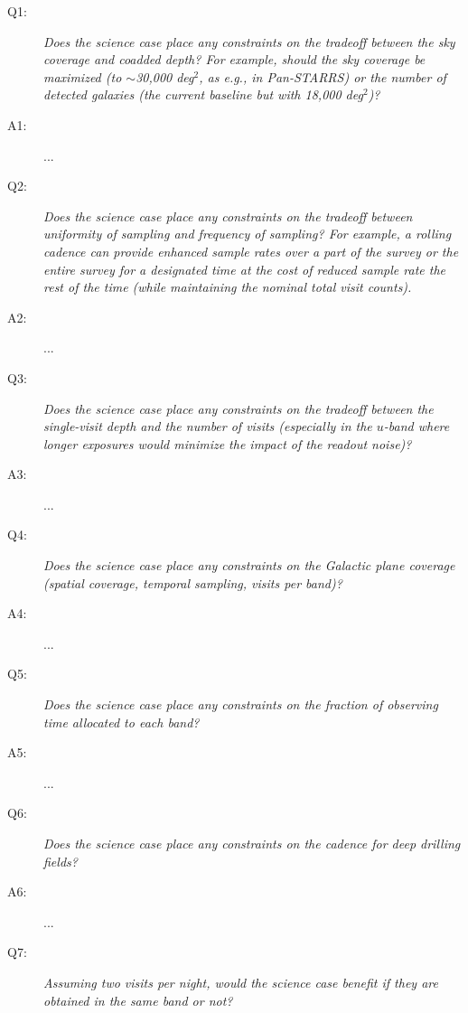 \begin{description}

\item[Q1:] {\it Does the science case place any constraints on the
tradeoff between the sky coverage and coadded depth? For example, should
the sky coverage be maximized (to $\sim$30,000 deg$^2$, as e.g., in
Pan-STARRS) or the number of detected galaxies (the current baseline but
with 18,000 deg$^2$)?}

\item[A1:] ...

\item[Q2:] {\it Does the science case place any constraints on the
tradeoff between uniformity of sampling and frequency of  sampling? For
example, a rolling cadence can provide enhanced sample rates over a part
of the survey or the entire survey for a designated time at the cost of
reduced sample rate the rest of the time (while maintaining the nominal
total visit counts).}

\item[A2:] ...

\item[Q3:] {\it Does the science case place any constraints on the
tradeoff between the single-visit depth and the number of visits
(especially in the $u$-band where longer exposures would minimize the
impact of the readout noise)?}

\item[A3:] ...

\item[Q4:] {\it Does the science case place any constraints on the
Galactic plane coverage (spatial coverage, temporal sampling, visits per
band)?}

\item[A4:] ...

\item[Q5:] {\it Does the science case place any constraints on the
fraction of observing time allocated to each band?}

\item[A5:] ...

\item[Q6:] {\it Does the science case place any constraints on the
cadence for deep drilling fields?}

\item[A6:] ...

\item[Q7:] {\it Assuming two visits per night, would the science case
benefit if they are obtained in the same band or not?}


\end{description}
